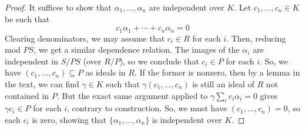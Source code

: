 \begin{proof}
	It suffices to show that $\alpha_1,\ldots,\alpha_n$ are independent over $K$. Let $c_1,\ldots,c_n \in K$ be such that
	\[ c_1\alpha_1 + \cdots + c_n\alpha_n = 0 \]
	Clearing denominators, we may assume that $c_i \in R$ for each $i$. Then, reducing mod $PS$, we get a similar dependence relation. The images of the $\alpha_i$ are independent in $S/PS$ (over $R/P$), so we conclude that $c_i \in P$ for each $i$. So, we have $(c_1,\ldots,c_n) \subseteq P$ as ideals in $R$. If the former is nonzero, then by a lemma in the text, we can find $\gamma \in K$ such that $\gamma(c_1,\ldots,c_n)$ is still an ideal of $R$ not contained in $P$. But the exact same argument applied to $\gamma\sum_i c_i\alpha_i = 0$ gives $\gamma c_i \in P$ for each $i$, contrary to construction. So, we must have $(c_1,\ldots,c_n) = 0$, so each $c_i$ is zero, showing that $\{\alpha_1,\ldots,\alpha_n\}$ is independent over $K$.
\end{proof}

